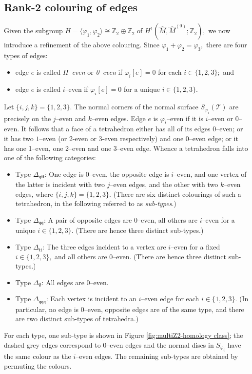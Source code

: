 \documentclass[a4paper]{gtart}
\def\tri{\mathcal{T}}
\def\manifold{M}
\def\Z{\mathbb{Z}}
\def\Tee{\Delta_{\emptyset}}
\def\Ttt{\Delta_{\mathfrak{tt}}}
\def\Tqtt{\Delta_{\mathfrak{qtt}}}
\def\Tqq{\Delta_{\mathfrak{qq}}}
\def\Tqqq{\Delta_{\mathfrak{qqq}}}
\theoremstyle{plain}
\theoremstyle{definition}
\theoremstyle{remark}
\numberwithin{equation}{section}
\begin{document}
\subsection{Rank-2 colouring of edges}
\label{subsec:rank-2 colouring}

Given the subgroup $H = \langle \varphi_1, \varphi_2 \rangle \cong \Z_2 \oplus \Z_2$ of $H^1(\widehat{\manifold}, \widehat{\manifold}^{(0)}; \Z_2),$ we now introduce a refinement of the above colouring. Since $\varphi_1 + \varphi_2 = \varphi_3,$ there are four types of edges:
\begin{itemize}
\item[] edge $e$ is called \emph{$H$--even} or \emph{0--even} if $\varphi_i[e] =0$ for each $i \in \{ 1,2,3\};$ and
\item[] edge $e$ is called $i$--even if $\varphi_i[e] =0$ for a unique $i \in \{ 1,2,3\}.$
\end{itemize}
Let $\{ i,j,k\} = \{ 1,2,3\}.$ The normal corners of the normal surface $S_{\varphi_i}(\tri)$ are precisely on the $j$--even and $k$--even edges. Edge $e$ is $\varphi_i$--even if it is $i$--even or 0--even. It follows that a face of a tetrahedron either has all of its edges 0--even; or it has two $1$--even (or $2$-even or $3$-even respectively) and one 0--even edge; or it has one 1--even, one 2--even and one 3--even edge. Whence a tetrahedron falls into one of the following categories:

\begin{itemize}
\item[] Type $\Tqtt$: One edge is 0--even, the opposite edge is $i$--even, and one vertex of the latter is incident with two $j$--even edges, and the other with two $k$--even edges, where $\{i,j,k\} = \{ 1,2,3\}.$ (There are six distinct colourings of such a tetrahedron, in the following referred to as {\em sub-types}.)
\item[] Type $\Tqq$: A pair of opposite edges are 0--even, all others are $i$--even for a unique $i \in \{ 1,2,3\}.$ (There are hence three distinct sub-types.)
\item[] Type $\Ttt$: The three edges incident to a vertex are $i$--even for a fixed $i \in \{ 1,2,3\},$ and all others are 0--even. (There are hence three distinct sub-types.)
\item[] Type $\Tee$: All edges are 0--even.
\item[] Type $\Tqqq$: Each vertex is incident to an $i$--even edge for each $i \in \{ 1,2,3\}.$ (In particular, no edge is 0--even, opposite edges are of the same type, and there are two distinct sub-types of tetrahedra.)
\end{itemize}
For each type, one sub-type is shown in Figure \ref{fig:multiZ2-homology class}; the dashed grey edges correspond to 0--even edges and the normal discs in $S_{\varphi_i}$ have the same colour as the $i$--even edges. The remaining sub-types are obtained by permuting the colours.
\end{document}
